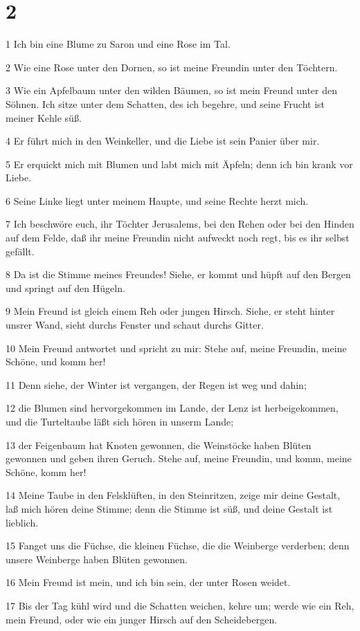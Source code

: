 \chapter{2}

\par 1 Ich bin eine Blume zu Saron und eine Rose im Tal.
\par 2 Wie eine Rose unter den Dornen, so ist meine Freundin unter den Töchtern.
\par 3 Wie ein Apfelbaum unter den wilden Bäumen, so ist mein Freund unter den Söhnen. Ich sitze unter dem Schatten, des ich begehre, und seine Frucht ist meiner Kehle süß.
\par 4 Er führt mich in den Weinkeller, und die Liebe ist sein Panier über mir.
\par 5 Er erquickt mich mit Blumen und labt mich mit Äpfeln; denn ich bin krank vor Liebe.
\par 6 Seine Linke liegt unter meinem Haupte, und seine Rechte herzt mich.
\par 7 Ich beschwöre euch, ihr Töchter Jerusalems, bei den Rehen oder bei den Hinden auf dem Felde, daß ihr meine Freundin nicht aufweckt noch regt, bis es ihr selbst gefällt.
\par 8 Da ist die Stimme meines Freundes! Siehe, er kommt und hüpft auf den Bergen und springt auf den Hügeln.
\par 9 Mein Freund ist gleich einem Reh oder jungen Hirsch. Siehe, er steht hinter unsrer Wand, sieht durchs Fenster und schaut durchs Gitter.
\par 10 Mein Freund antwortet und spricht zu mir: Stehe auf, meine Freundin, meine Schöne, und komm her!
\par 11 Denn siehe, der Winter ist vergangen, der Regen ist weg und dahin;
\par 12 die Blumen sind hervorgekommen im Lande, der Lenz ist herbeigekommen, und die Turteltaube läßt sich hören in unserm Lande;
\par 13 der Feigenbaum hat Knoten gewonnen, die Weinstöcke haben Blüten gewonnen und geben ihren Geruch. Stehe auf, meine Freundin, und komm, meine Schöne, komm her!
\par 14 Meine Taube in den Felsklüften, in den Steinritzen, zeige mir deine Gestalt, laß mich hören deine Stimme; denn die Stimme ist süß, und deine Gestalt ist lieblich.
\par 15 Fanget uns die Füchse, die kleinen Füchse, die die Weinberge verderben; denn unsere Weinberge haben Blüten gewonnen.
\par 16 Mein Freund ist mein, und ich bin sein, der unter Rosen weidet.
\par 17 Bis der Tag kühl wird und die Schatten weichen, kehre um; werde wie ein Reh, mein Freund, oder wie ein junger Hirsch auf den Scheidebergen.

